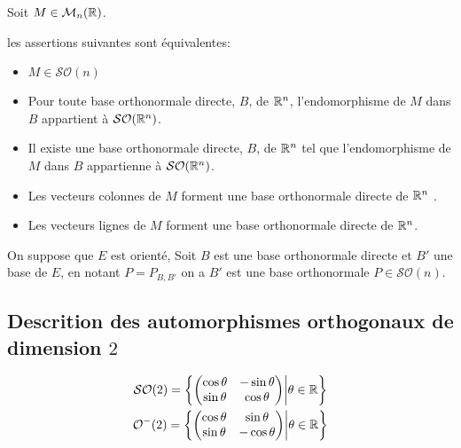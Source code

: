 \begin{prp}
Soit $M \in \operatorname{\mathcal{M}}_n(\mathbb{R})$.

les assertions suivantes sont équivalentes:
\begin{itemize}
    \item $M \in \mathcal{SO}(n)$
    \item Pour toute base orthonormale directe, $B$, de $\mathbb{R}^n$,
        l'endomorphisme de $M$ dans $B$ appartient à $\mathcal{SO}(\mathbb{R}^n)$.
    \item Il existe une base orthonormale directe, $B$, de $\mathbb{R}^n$ tel que
        l'endomorphisme de $M$ dans $B$ appartienne à $\mathcal{SO}(\mathbb{R}^n)$.
    \item Les vecteurs colonnes de $M$ forment une base orthonormale
        directe de $\mathbb{R}^n$ .
    \item Les vecteurs lignes de $M$ forment une base orthonormale
        directe de $\mathbb{R}^n$.
\end{itemize}
\end{prp}

\begin{prp}
On suppose que $E$ est orienté, Soit $B$ est une base orthonormale directe
et $B'$ une base de $E$, en notant $P = P_{B, B'}$ on a $B'$ est une
base orthonormale \ssi $P \in \mathcal{SO}(n)$.
\end{prp}

\subsection{Descrition des automorphismes orthogonaux de dimension $2$}

\begin{prp}
\begin{gather*}
    \mathcal{SO}(2) = \left\{
        \begin{pmatrix}
            \cos \theta & -\sin \theta \\
            \sin \theta & \cos \theta
        \end{pmatrix}
        \middle| \theta \in \mathbb{R}
    \right\} \\
    \mathcal{O}^-(2) = \left\{
        \begin{pmatrix}
            \cos \theta & \sin \theta \\
            \sin \theta & -\cos \theta
        \end{pmatrix}
        \middle| \theta \in \mathbb{R}
    \right\}
\end{gather*}
\end{prp}

